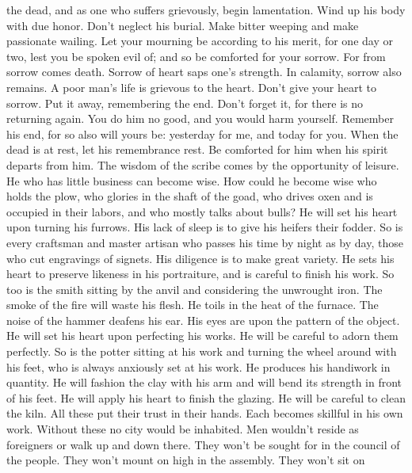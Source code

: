 the dead, and as one who suffers grievously, begin lamentation. Wind up
his body with due honor. Don't neglect his burial.  Make
bitter weeping and make passionate wailing. Let your mourning be
according to his merit, for one day or two, lest you be spoken evil of;
and so be comforted for your sorrow.  For from sorrow
comes death. Sorrow of heart saps one's strength.  In
calamity, sorrow also remains. A poor man's life is grievous to the
heart.  Don't give your heart to sorrow. Put it away,
remembering the end.  Don't forget it, for there is no
returning again. You do him no good, and you would harm yourself.
 Remember his end, for so also will yours be: yesterday
for me, and today for you.  When the dead is at rest, let
his remembrance rest. Be comforted for him when his spirit departs from
him.  The wisdom of the scribe comes by the opportunity
of leisure. He who has little business can become wise. 
How could he become wise who holds the plow, who glories in the shaft of
the goad, who drives oxen and is occupied in their labors, and who
mostly talks about bulls?  He will set his heart upon
turning his furrows. His lack of sleep is to give his heifers their
fodder.  So is every craftsman and master artisan who
passes his time by night as by day, those who cut engravings of signets.
His diligence is to make great variety. He sets his heart to preserve
likeness in his portraiture, and is careful to finish his work.
 So too is the smith sitting by the anvil and considering
the unwrought iron. The smoke of the fire will waste his flesh. He toils
in the heat of the furnace. The noise of the hammer deafens his ear. His
eyes are upon the pattern of the object. He will set his heart upon
perfecting his works. He will be careful to adorn them perfectly.
 So is the potter sitting at his work and turning the
wheel around with his feet, who is always anxiously set at his work. He
produces his handiwork in quantity.  He will fashion the
clay with his arm and will bend its strength in front of his feet. He
will apply his heart to finish the glazing. He will be careful to clean
the kiln.  All these put their trust in their hands. Each
becomes skillful in his own work.  Without these no city
would be inhabited. Men wouldn't reside as foreigners or walk up and
down there.  They won't be sought for in the council of
the people. They won't mount on high in the assembly. They won't sit on
